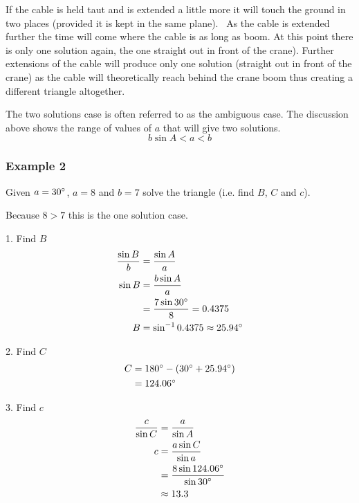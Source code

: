 If the cable is held taut and is extended a little more it will touch the ground in two places (provided it is kept in the same plane).
\ As the cable is extended further the time will come where the cable is as long as boom. At
this point there is only one solution again, the one straight out in front of the crane). Further extensions
of the cable will produce only one solution (straight out in front of the crane) as the cable will theoretically reach behind the crane boom thus creating
a different triangle altogether. 

The two solutions case is often referred to as the ambiguous case. The
discussion above shows the range of values of $a$ that will give two solutions.
\begin{equation*}b \sin  A <a <b
\end{equation*}

\subsubsection{Example 2}
Given $a =30 \mbox{{\ensuremath{{}^\circ}}}$, $a =8$ and $b =7$ solve the triangle (i.e. find $B$, $C$ and $c$). 

   
\setlength\fboxrule{0in}\setlength\fboxsep{0.2in}


Because $8 >7$ this is the one solution case. 

1. Find $B$
\begin{align*}\frac{\sin  B}{b} &  = \frac{\sin  A}{a} \\
\sin  B &  = \frac{b \sin  A}{a} \\
 &  = \frac{7 \sin  30 \mbox{{\ensuremath{{}^\circ}}}}{8} =0.4375 \\
B &  = \sin ^{ -1} 0.4375 \approx 25.94 \mbox{{\ensuremath{{}^\circ}}}\end{align*}

2. Find $C$
\begin{align*}C &  = 180 \mbox{{\ensuremath{{}^\circ}}} -(30 \mbox{{\ensuremath{{}^\circ}}} +25.94 \mbox{{\ensuremath{{}^\circ}}}) \\
 &  = 124.06 \mbox{{\ensuremath{{}^\circ}}}\end{align*}

3. Find $c$
\begin{align*}\frac{c}{\sin  C} &  = \frac{a}{\sin  A} \\
c &  = \frac{a \sin  C}{\sin a} \\
 &  = \frac{8 \sin  124.06 \mbox{{\ensuremath{{}^\circ}}}}{\sin  30 \mbox{{\ensuremath{{}^\circ}}}} \\
 &  \approx   13.3\end{align*}

